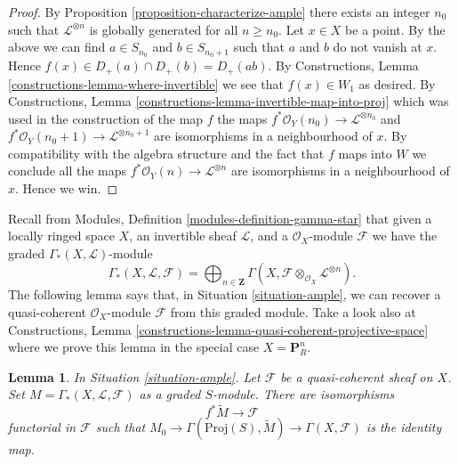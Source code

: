 \documentclass{stacks-project}
\theoremstyle{plain}
\newtheorem{lemma}[subsection]{Lemma}
\theoremstyle{definition}
\theoremstyle{remark}
\numberwithin{equation}{subsection}
\begin{document}
\begin{proof}
By Proposition \ref{proposition-characterize-ample} there exists an integer
$n_0$ such that $\mathcal{L}^{\otimes n}$ is globally generated for all
$n \geq n_0$. Let $x \in X$ be a point. By the above we can find
$a \in S_{n_0}$ and $b \in S_{n_0 + 1}$ such that
$a$ and $b$ do not vanish at $x$. Hence
$f(x) \in D_{+}(a) \cap D_{+}(b) = D_{+}(ab)$. By
Constructions, Lemma \ref{constructions-lemma-where-invertible}
we see that $f(x) \in W_1$ as desired. By
Constructions, Lemma \ref{constructions-lemma-invertible-map-into-proj}
which was used in the construction of the map $f$
the maps
$f^*\mathcal{O}_Y(n_0) \to \mathcal{L}^{\otimes n_0}$ and
$f^*\mathcal{O}_Y(n_0 + 1) \to \mathcal{L}^{\otimes n_0 + 1}$
are isomorphisms in a neighbourhood of $x$. By compatibility with
the algebra structure and the fact that $f$ maps into $W$
we conclude all the maps
$f^*\mathcal{O}_Y(n) \to \mathcal{L}^{\otimes n}$ are isomorphisms
in a neighbourhood of $x$. Hence we win.
\end{proof}

\noindent
Recall from Modules, Definition \ref{modules-definition-gamma-star}
that given a locally ringed space $X$, an invertible sheaf $\mathcal{L}$,
and a $\mathcal{O}_X$-module $\mathcal{F}$ we have the graded
$\Gamma_*(X, \mathcal{L})$-module
$$
\Gamma_*(X, \mathcal{L}, \mathcal{F}) =
\bigoplus\nolimits_{n \in \mathbf{Z}}
\Gamma(X, \mathcal{F} \otimes_{\mathcal{O}_X} \mathcal{L}^{\otimes n}).
$$
The following lemma says that, in Situation \ref{situation-ample},
we can recover a quasi-coherent $\mathcal{O}_X$-module $\mathcal{F}$
from this graded module. Take a look also at
Constructions, Lemma \ref{constructions-lemma-quasi-coherent-projective-space}
where we prove this lemma in the special case $X = \mathbf{P}^n_R$.

\begin{lemma}
\label{lemma-ample-quasi-coherent}
In Situation \ref{situation-ample}.
Let $\mathcal{F}$ be a quasi-coherent sheaf on $X$.
Set $M = \Gamma_*(X, \mathcal{L}, \mathcal{F})$ as a graded $S$-module.
There are isomorphisms
$$
f^*\widetilde{M} \longrightarrow \mathcal{F}
$$
functorial in $\mathcal{F}$ such that
$M_0 \to \Gamma(\text{Proj}(S), \widetilde{M}) \to \Gamma(X, \mathcal{F})$
is the identity map.
\end{lemma}
\end{document}
